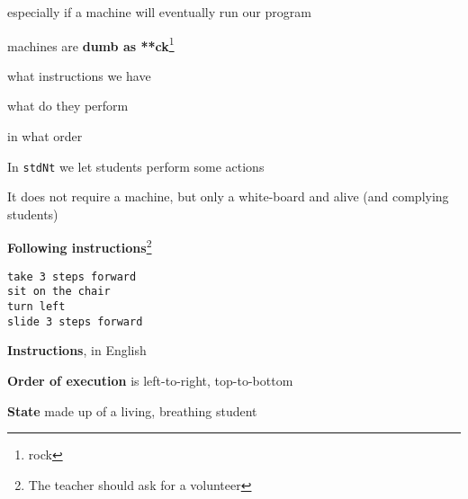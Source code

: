 \documentclass{beamer}
\begin{document}
\begin{slide}{
\item especially if a machine will eventually run our program
\item machines are \textbf{dumb as **ck}\footnote{rock}
}\end{slide}

\begin{slide}{
\item what instructions we have
\item what do they perform
\item in what order
}\end{slide}

\begin{slide}{
\item In \texttt{stdNt} we let students perform some actions
\item It does not require a machine, but only a white-board and alive (and complying students)
}\end{slide}

\begin{frame}[fragile]
\textbf{Following instructions}\footnote{The teacher should ask for a volunteer}

\begin{lstlisting}[frame=shadowbox]
take 3 steps forward
sit on the chair
turn left
slide 3 steps forward
\end{lstlisting}
\end{frame}

\begin{slide}{
\item \textbf{Instructions}, in English
\item \textbf{Order of execution} is left-to-right, top-to-bottom
\item \textbf{State} made up of a living, breathing student
}\end{slide}

\end{document}
